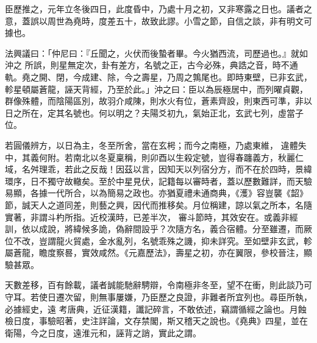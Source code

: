 \begin{pinyinscope}
 臣歷推之，元年立冬後四日，此度昏中，乃處十月之初，又非寒露之日也。議者之意，蓋誤以周世為堯時，度差五十，故致此謬。小雪之節，自信之談，非有明文可據也。



 法興議曰：「仲尼曰：『丘聞之，火伏而後蟄者畢。今火猶西流，司歷過也。』就如沖之
 所誤，則星無定次，卦有差方，名號之正，古今必殊，典誥之音，時不通軌。堯之開、閉，今成建、除，今之壽星，乃周之鶉尾也。即時東壁，已非玄武，軫星頓屬蒼龍，誣天背經，乃至於此。」沖之曰：臣以為辰極居中，而列曜貞觀，群像殊體，而陰陽區別，故羽介咸陳，則水火有位，蒼素齊設，則東西可準，非以日之所在，定其名號也。何以明之？夫陽爻初九，氣始正北，玄武七列，虛當子位。



 若圓儀辨方，以日為主，冬至所舍，當在玄枵；而今之南極，乃處東維，
 違體失中，其義何附。若南北以冬夏稟稱，則卯酉以生殺定號，豈得春躔義方，秋麗仁域，名舛理乖，若此之反哉！因茲以言，因知天以列宿分方，而不在於四時，景緯環序，日不獨守故轍矣。至於中星見伏，記籍每以審時者，蓋以歷數難詳，而天驗易顯，各據一代所合，以為簡易之政也。亦猶夏禮未通商典，《濩》容豈襲《韶》節，誠天人之道同差，則藝之興，因代而推移矣。月位稱建，諒以氣之所本，名隨實著，非謂斗杓所指。近校漢時，已差半次，
 審斗節時，其效安在。或義非經訓，依以成說，將緯候多詭，偽辭間設乎？次隨方名，義合宿體。分至雖遷，而厥位不改，豈謂龍火貿處，金水亂列，名號乖殊之譏，抑未詳究。至如壁非玄武，軫屬蒼龍，瞻度察晷，實效咸然。《元嘉歷法》，壽星之初，亦在翼限，參校晉注，顯驗甚眾。



 天數差移，百有餘載，議者誠能馳辭騁辯，令南極非冬至，望不在衝，則此談乃可守耳。若使日遷次留，則無事屢嫌，乃臣歷之良證，非難者所宜列也。尋臣所執，必據經史，遠
 考唐典，近征漢籍，讖記碎言，不敢依述，竊謂循經之論也。月蝕檢日度，事驗昭著，史注詳論，文存禁閣，斯又稽天之說也。《堯典》四星，並在衛陽，今之日度，遠淮元和，誣背之誚，實此之謂。




\end{pinyinscope}
